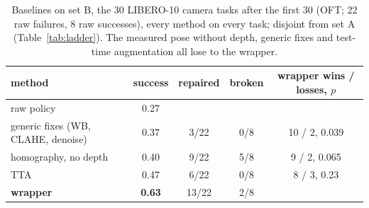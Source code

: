 \documentclass{article}
\begin{document}
\begin{table}[h]
\centering\small
\caption{Baselines on set B, the 30 LIBERO-10 camera tasks after the first 30 (OFT; 22 raw failures, 8 raw successes),
every method on every task; disjoint from set A (Table~\ref{tab:ladder}). The measured pose without depth, generic fixes
and test-time augmentation all lose to the wrapper.}
\label{tab:baselines}
\begin{tabular}{lcccc}
\toprule
method & success & repaired & broken & wrapper wins / losses, $p$ \\
\midrule
raw policy & 0.27 & & & \\
generic fixes (WB, CLAHE, denoise) & 0.37 & 3/22 & 0/8 & 10 / 2, 0.039 \\
homography, no depth & 0.40 & 9/22 & 5/8 & 9 / 2, 0.065 \\
TTA & 0.47 & 6/22 & 0/8 & 8 / 3, 0.23 \\
\textbf{wrapper} & \textbf{0.63} & 13/22 & 2/8 & \\
\bottomrule
\end{tabular}
\end{table}
\end{document}
